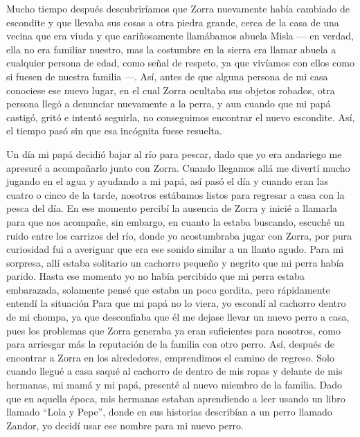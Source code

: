 Mucho tiempo después descubriríamos que Zorra nuevamente había cambiado de escondite y que llevaba sus cosas a otra piedra grande, cerca de la casa de una vecina que era viuda y que cariñosamente llamábamos abuela Misla --- en verdad, ella no era familiar nuestro, mas la costumbre en la sierra era llamar abuela a cualquier persona de edad, como señal de respeto, ya que vivíamos con ellos como si fuesen de nuestra familia ---.
Así, antes de que alguna persona de mi casa conociese ese nuevo lugar, en el cual Zorra ocultaba sus objetos robados, otra persona llegó a denunciar nuevamente a la perra, y aun cuando que mi papá castigó, gritó e intentó seguirla, no conseguimos encontrar el nuevo escondite. Así, el tiempo pasó sin que esa incógnita fuese resuelta.

Un día mi papá decidió bajar al río para pescar, dado que yo era andariego me apresuré a acompañarlo junto con Zorra. 
Cuando llegamos allá me divertí mucho jugando en el agua y ayudando a mi papá, así pasó el día y cuando eran las cuatro o cinco de la tarde, nosotros estábamos listos para regresar a casa con la pesca del día.
En ese momento percibí la ausencia de Zorra y inicié a llamarla para que nos acompañe, 
sin embargo, en cuanto la estaba buscando, escuché un ruido entre los carrizos del río, donde yo acostumbraba jugar con Zorra, por pura curiosidad fui a averiguar que era ese sonido similar a un llanto agudo. Para mi sorpresa, allí estaba solitario un cachorro pequeño y negrito que mi perra había parido.
Hasta ese momento yo no había percibido que mi perra estaba embarazada, solamente pensé que estaba un poco gordita,
pero rápidamente entendí la situación
Para que mi papá no lo viera, yo escondí al cachorro dentro de mi chompa, ya que desconfiaba que él me dejase llevar un nuevo perro a casa, pues los problemas que Zorra generaba ya eran suficientes para nosotros, como para arriesgar más la reputación de la familia con otro perro.
Así, después de encontrar a Zorra en los alrededores, emprendimos el camino de regreso.
Solo cuando llegué a casa saqué al cachorro de dentro de mis ropas y delante de mis hermanas, mi mamá y mi papá, presenté al nuevo miembro de la familia. Dado que en aquella época, mis hermanas estaban aprendiendo a leer usando un libro llamado ``Lola y Pepe'', donde en sus historias describían a un perro llamado Zandor, yo decidí usar ese nombre para mi nuevo perro.

